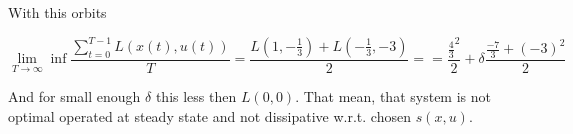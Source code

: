 \begin{Example}
 With this orbits

 $$\lim_{T\rightarrow\infty}\inf\frac{\sum_{t=0}^{T-1}L(x(t),u(t))}{T}=\frac{L(1,-\frac{1}{3})+L(-\frac{1}{3},-3)}{2}=
  = \frac{\frac{4}{3}^2}{2}+\delta\frac{\frac{-7}{3}+(-3)^2}{2}$$

  And for small enough $\delta$ this less then $L(0,0)$. That mean, that system is not optimal 
  operated at steady state and not dissipative w.r.t. chosen $s(x,u)$. 


\end{Example}
